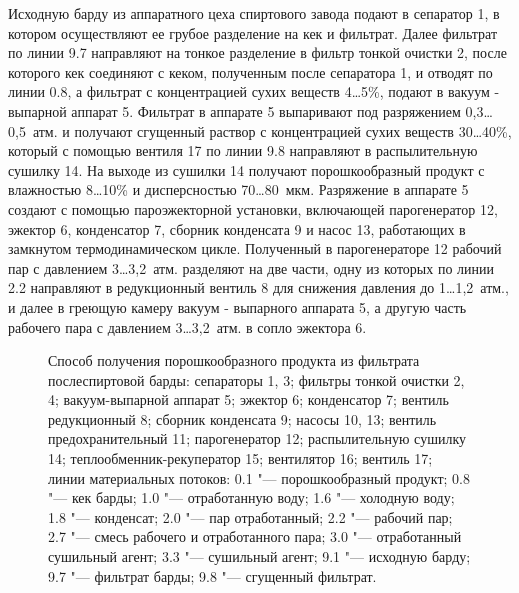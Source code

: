 Исходную барду из аппаратного цеха спиртового завода подают в сепаратор 1, в котором осуществляют ее грубое разделение на кек и фильтрат. 
Далее фильтрат по линии 9.7 направляют на тонкое разделение в фильтр тонкой очистки 2, после которого кек соединяют с кеком, полученным после сепаратора 1, и отводят по линии 0.8, а фильтрат с концентрацией сухих веществ 4\dots5\%, подают в вакуум - выпарной аппарат 5. 
Фильтрат в аппарате 5 выпаривают под разряжением 0,3\dots0,5~атм. и получают сгущенный раствор с концентрацией сухих веществ 30\dots40\%, который с помощью вентиля 17 по линии 9.8 направляют в распылительную сушилку 14. 
На выходе из сушилки 14 получают порошкообразный продукт с влажностью 8\dots10\% и дисперсностью 70\dots80~мкм. 
Разряжение в аппарате 5 создают с помощью пароэжекторной установки, включающей парогенератор 12, эжектор 6, конденсатор 7, сборник конденсата 9 и насос 13, работающих в замкнутом термодинамическом цикле. 
Полученный в парогенераторе 12 рабочий пар с давлением 3\dots3,2~атм. разделяют на две части, одну из которых по линии 2.2 направляют в редукционный вентиль 8 для снижения давления до 1\dots1,2~атм., и далее в греющую камеру вакуум - выпарного аппарата 5, а другую часть рабочего пара с давлением 3\dots3,2~атм. в сопло эжектора 6. 

\begin{figure} 
\centering
\begin{small}
\def\svgwidth{\linewidth}

\end{small}
\caption[Способ получения порошкообразного продукта из фильтрата послеспиртовой барды]{Способ получения порошкообразного продукта из фильтрата послеспиртовой барды:
сепараторы 1, 3; фильтры тонкой очистки 2, 4; вакуум-выпарной
аппарат 5; эжектор 6; конденсатор 7; вентиль редукционный 8; сборник конденсата 9;
насосы 10, 13; вентиль предохранительный 11; парогенератор 12; распылительную
сушилку 14; теплообменник-рекуператор 15; вентилятор 16; вентиль 17; линии
материальных потоков: 0.1 "--- порошкообразный продукт; 0.8 "--- кек барды; 1.0 "---
отработанную воду; 1.6 "--- холодную воду; 1.8 "--- конденсат; 2.0 "--- пар отработанный; 2.2
"--- рабочий пар; 2.7 "--- смесь рабочего и отработанного пара; 3.0 "--- отработанный сушильный
агент; 3.3 "--- сушильный агент; 9.1 "--- исходную барду; 9.7 "--- фильтрат барды; 9.8 "--- сгущенный
фильтрат.}\label{fiq:patent_powder}
\end{figure}

